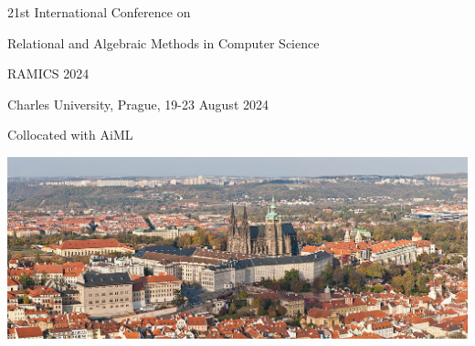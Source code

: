 \documentclass[a3paper, 12pt]{article}
\begin{document}
\begin{center}
  {\Huge 21st International Conference on}

  \medskip

  {\Huge Relational and Algebraic Methods in Computer Science}

  \bigskip

  {\fontsize{36}{50}\selectfont RAMICS 2024}

  \bigskip

  {\Huge Charles University, Prague, 19-23 August 2024}

  \medskip

  {\Huge Collocated with AiML}
  
  \bigskip

  \includegraphics[width=.6\linewidth]{prague}

  \medskip
\end{center}
\end{document}
